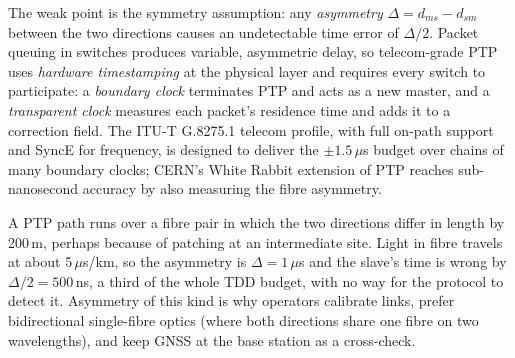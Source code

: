 The weak point is the symmetry assumption: any \emph{asymmetry} $\Delta=d_{ms}-d_{sm}$ between the two
directions causes an undetectable time error of $\Delta/2$. Packet queuing in switches produces
variable, asymmetric delay, so telecom-grade PTP uses \emph{hardware timestamping} at the physical
layer and requires every switch to participate: a \emph{boundary clock} terminates PTP and acts as a
new master, and a \emph{transparent clock} measures each packet's residence time and adds it to a
correction field. The ITU-T G.8275.1 telecom profile, with full on-path support and SyncE for
frequency, is designed to deliver the $\pm1.5\,\mu$s budget over chains of many boundary clocks; CERN's
White Rabbit extension of PTP reaches sub-nanosecond accuracy by also measuring the fibre asymmetry.

\begin{worked}
A PTP path runs over a fibre pair in which the two directions differ in length by 200\,m, perhaps because
of patching at an intermediate site. Light in fibre travels at about 5\,$\mu$s/km, so the asymmetry is
$\Delta=1\,\mu$s and the slave's time is wrong by $\Delta/2=500$\,ns, a third of the whole TDD budget,
with no way for the protocol to detect it. Asymmetry of this kind is why operators calibrate links,
prefer bidirectional single-fibre optics (where both directions share one fibre on two wavelengths), and
keep GNSS at the base station as a cross-check.
\end{worked}


